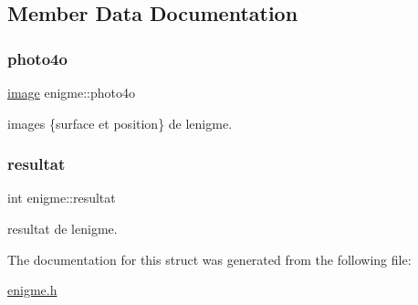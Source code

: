 \subsection{Member Data Documentation}
\mbox{\label{structenigme_a0d67b3258c7bb0d5397190ccc98ea4f1}} 
\subsubsection{\texorpdfstring{photo4o}{photo4o}}
{\footnotesize\ttfamily \hyperlink{structimage}{image} enigme\+::photo4o}

images \{surface et position\} de l\textquotesingle{}enigme. \mbox{\label{structenigme_a70a6dded93ce208bd1d4e2be4ab5e6e4}} 
\subsubsection{\texorpdfstring{resultat}{resultat}}
{\footnotesize\ttfamily int enigme\+::resultat}

resultat de l\textquotesingle{}enigme. 

The documentation for this struct was generated from the following file\+:\begin{DoxyCompactItemize}
\item 
\hyperlink{enigme_8h}{enigme.\+h}\end{DoxyCompactItemize}
